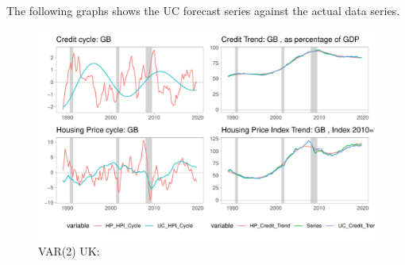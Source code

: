 \documentclass[12pt]{article}
\begin{document}
\begin{outline}[enumerate]
		
%		
%		

		
		The following graphs shows the UC forecast series against the actual data series.
		
		\begin{figure}[h!]
			\caption{VAR(2) UK: }	
			\centerline{\includegraphics[scale=0.7]{../../Regression/VAR_2/Output/Graphs/HP_Credit_4graphs_GB.pdf}}
		

\end{figure}
\end{outline}
\end{document}
